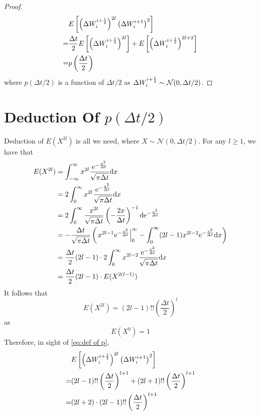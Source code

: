 \documentclass{homework}
\begin{document}
\begin{proof}
        \begin{equation}
            \label{eq:def of p}
            \begin{aligned}
            &E\left[
            \left(\Delta W_{i}^{i+\frac{1}{2}}\right)^{2l}
            \left(\Delta W_{i}^{i+1}\right)^2
            \right]\\
            =&\frac{\Delta t}{2}E\left[\left(\Delta W_{i}^{i+\frac{1}{2}}\right)^{2l}\right]
            +E\left[\left(\Delta W_{i}^{i+\frac{1}{2}}\right)^{2l+2}\right]\\
            =&p\left(\frac{\Delta t}{2}\right)
            \end{aligned}
        \end{equation}
        where $p(\Delta t/2)$ is a function of $\Delta t/2$
        as $\Delta W_{i}^{i+\frac{1}{2}}\sim\mathcal N(0,\Delta t/2)$.
    \end{proof}

    \section[Deduction Of p(Delta t/2)]{Deduction Of $p(\Delta t/2)$}
    \label{sec:deduction of p}
    Deduction of $E(X^{2l})$ is all we need, where $X\sim\mathcal N(0,\Delta t/2)$.
    For any $l\geq 1$, we have that
    \[\begin{aligned}
        E(X^{2l})&=\int_{-\infty}^\infty
        x^{2l}\frac{\mathrm e^{-\frac{x^2}{\Delta t}}}{\sqrt{\pi\Delta t}}
        \mathrm d x\\
        &=2\int_{0}^\infty
        x^{2l}\frac{\mathrm e^{-\frac{x^2}{\Delta t}}}{\sqrt{\pi\Delta t}}
        \mathrm d x\\
        &=2\int_{0}^\infty
        \frac{x^{2l}}{\sqrt{\pi\Delta t}}
        \left(-\frac{2x}{\Delta t}\right)^{-1}
        \mathrm d \mathrm e^{-\frac{x^2}{\Delta t}}\\
        &=-\frac{\Delta t}{\sqrt{\pi\Delta t}}
        \left(\left.x^{2l-1}\mathrm e^{-\frac{x^2}{\Delta t}}\right|^\infty_0
        -\int_0^\infty(2l-1)x^{2l-2}\mathrm e^{-\frac{x^2}{\Delta t}}\mathrm d x
        \right)\\
        &=\frac{\Delta t}{2}(2l-1)\cdot
        2\int_0^\infty x^{2l-2}\frac{\mathrm e^{-\frac{x^2}{\Delta t}}}{\sqrt{\pi\Delta t}}\mathrm d x\\
        &=\frac{\Delta t}{2}(2l-1)\cdot E(X^{2(l-1)})
    \end{aligned}\]
    It follows that
    \[E(X^{2l})=(2l-1)!!\left(\frac{\Delta t}{2}\right)^l\]
    as
    \[E(X^0)=1\]
    Therefore, in sight of \cref{eq:def of p},
    \[\begin{aligned}
        &E\left[\left(\Delta W_{i}^{i+\frac{1}{2}}\right)^{2l}
        \left(\Delta W_{i}^{i+1}\right)^2\right]\\
        =&(2l-1)!!\left(\frac{\Delta t}{2}\right)^{l+1}
        +(2l+1)!!\left(\frac{\Delta t}{2}\right)^{l+1}\\
        =&(2l+2)\cdot(2l-1)!!\left(\frac{\Delta t}{2}\right)^{l+1}
    \end{aligned}\]
\end{document}
